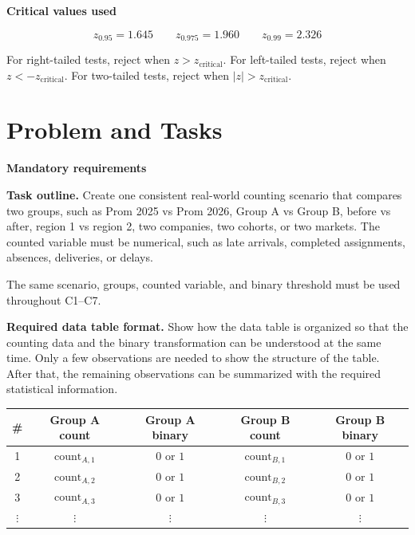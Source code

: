 \documentclass[12pt]{article}
\newcommand{\SubsectionBox}[1]{%
	\noindent\colorbox{gray!30}{%
		\parbox{\linewidth}{\textbf{#1}}%
	}\par\vspace{0.35cm}%
}
\begin{document}
	\vspace{0.25cm}
	
	\SubsectionBox{Critical values used}
	
	\[
	z_{0.95}=1.645
	\qquad
	z_{0.975}=1.960
	\qquad
	z_{0.99}=2.326
	\]
	
	For right-tailed tests, reject when \(z>z_{\text{critical}}\). For left-tailed tests, reject when \(z<-z_{\text{critical}}\). For two-tailed tests, reject when \(|z|>z_{\text{critical}}\).
	

\section*{Problem and Tasks}

\SubsectionBox{Mandatory requirements}

\textbf{Task outline.} Create one consistent real-world counting scenario that compares two groups, such as Prom 2025 vs Prom 2026, Group A vs Group B, before vs after, region 1 vs region 2, two companies, two cohorts, or two markets. The counted variable must be numerical, such as late arrivals, completed assignments, absences, deliveries, or delays.

The same scenario, groups, counted variable, and binary threshold must be used throughout C1--C7.

\textbf{Required data table format.} Show how the data table is organized so that the counting data and the binary transformation can be understood at the same time. Only a few observations are needed to show the structure of the table. After that, the remaining observations can be summarized with the required statistical information.

\begin{center}
	\scriptsize
	\begin{tabular}{|c|c|c|c|c|}
		\hline
		\textbf{\#} & \textbf{Group A count} & \textbf{Group A binary} & \textbf{Group B count} & \textbf{Group B binary} \\
		\hline
		1 & \(\text{count}_{A,1}\) & \(0\text{ or }1\) & \(\text{count}_{B,1}\) & \(0\text{ or }1\) \\
		2 & \(\text{count}_{A,2}\) & \(0\text{ or }1\) & \(\text{count}_{B,2}\) & \(0\text{ or }1\) \\
		3 & \(\text{count}_{A,3}\) & \(0\text{ or }1\) & \(\text{count}_{B,3}\) & \(0\text{ or }1\) \\
		\(\vdots\) & \(\vdots\) & \(\vdots\) & \(\vdots\) & \(\vdots\) \\
		\hline
	\end{tabular}
\end{center}
\end{document}
